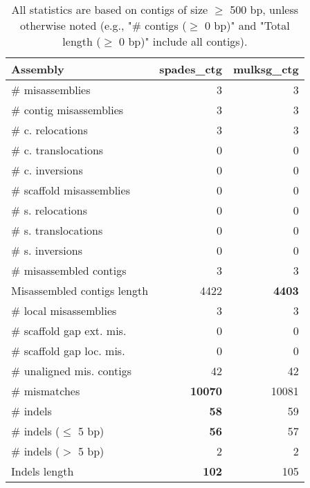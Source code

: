 \documentclass[12pt,a4paper]{article}
\begin{document}
\begin{table}[ht]
\begin{center}
\caption{All statistics are based on contigs of size $\geq$ 500 bp, unless otherwise noted (e.g., "\# contigs ($\geq$ 0 bp)" and "Total length ($\geq$ 0 bp)" include all contigs).}
\begin{tabular}{|l*{2}{|r}|}
\hline
Assembly & spades\_ctg & mulksg\_ctg \\ \hline
\# misassemblies & 3 & 3 \\ \hline
\hspace{2mm}\# contig misassemblies & 3 & 3 \\ \hline
\hspace{5mm}\# c. relocations & 3 & 3 \\ \hline
\hspace{5mm}\# c. translocations & 0 & 0 \\ \hline
\hspace{5mm}\# c. inversions & 0 & 0 \\ \hline
\hspace{2mm}\# scaffold misassemblies & 0 & 0 \\ \hline
\hspace{5mm}\# s. relocations & 0 & 0 \\ \hline
\hspace{5mm}\# s. translocations & 0 & 0 \\ \hline
\hspace{5mm}\# s. inversions & 0 & 0 \\ \hline
\# misassembled contigs & 3 & 3 \\ \hline
Misassembled contigs length & 4422 & {\bf 4403} \\ \hline
\# local misassemblies & 3 & 3 \\ \hline
\# scaffold gap ext. mis. & 0 & 0 \\ \hline
\# scaffold gap loc. mis. & 0 & 0 \\ \hline
\# unaligned mis. contigs & 42 & 42 \\ \hline
\# mismatches & {\bf 10070} & 10081 \\ \hline
\# indels & {\bf 58} & 59 \\ \hline
\hspace{5mm}\# indels ($\leq$ 5 bp) & {\bf 56} & 57 \\ \hline
\hspace{5mm}\# indels ($>$ 5 bp) & 2 & 2 \\ \hline
Indels length & {\bf 102} & 105 \\ \hline
\end{tabular}
\end{center}
\end{table}
\end{document}
